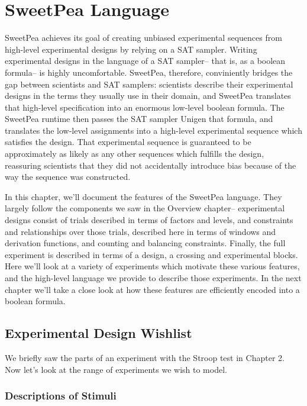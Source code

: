 
\chapter{SweetPea Language}

SweetPea achieves its goal of creating unbiased experimental sequences from high-level experimental designs by relying on a SAT sampler. Writing experimental designs in the language of a SAT sampler-- that is, as a boolean formula-- is highly uncomfortable. SweetPea, therefore, conviniently bridges the gap between scientists and SAT samplers: scientists describe their experimental designs in the terms they usually use in their domain, and SweetPea translates that high-level specification into an enormous low-level boolean formula. The SweetPea runtime then passes the SAT sampler Unigen that formula, and translates the low-level assignments into a high-level experimental sequence which satisfies the design. That experimental sequence is guaranteed to be approximately as likely as any other sequences which fulfills the design, reassuring scientists that they did not accidentally introduce bias because of the way the sequence was constructed.

In this chapter, we'll document the features of the SweetPea language. They largely follow the components we saw in the Overview chapter-- experimental designs consist of trials described in terms of factors and levels, and constraints and relationships over those trials, described here in terms of windows and derivation functions, and counting and balancing constraints. Finally, the full experiment is described in terms of a design, a crossing and experimental blocks. Here we'll look at a variety of experiments which motivate these various features, and the high-level language we provide to describe those experiments. In the next chapter we'll take a close look at how these features are efficiently encoded into a boolean formula.


\section{Experimental Design Wishlist}

We briefly saw the parts of an experiment with the Stroop test in Chapter 2. Now let's look at the range of experiments we wish to model.

\subsection{Descriptions of Stimuli}

